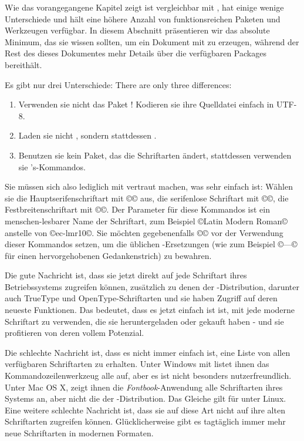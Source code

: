 \documentclass{lltxdoc}
\begin{document}
Wie das vorangegangene Kapitel zeigt ist \lualatex vergleichbar mit \latex, hat 
einige wenige Unterschiede und hält eine höhere Anzahl von funktionsreichen Paketen 
und Werkzeugen verfügbar. In diesem Abschnitt präsentieren wir das absolute
Minimum, das sie wissen sollten, um ein Dokument mit \lualatex zu erzeugen, während 
der Rest des dieses Dokumentes mehr Details über die verfügbaren Packages 
bereithält.

Es gibt nur drei Unterschiede:
There are only three differences:
\begin{enumerate}
  \item Verwenden sie nicht das Paket ! Kodieren sie ihre Quelldatei
        einfach in UTF-8.
  \item Laden sie nicht , sondern stattdessen .

  \item Benutzen sie kein Paket, das die Schriftarten ändert, stattdessen
        verwenden sie 's-Kommandos.
\end{enumerate}

Sie müssen sich also lediglich  mit  vertraut machen, was sehr 
einfach ist: Wählen sie die Hauptserifenschriftart mit ©\setmainfont© aus, die 
serifenlose Schriftart mit ©\setsansfont©, die Festbreitenschriftart mit
©\setmonofont©. Der Parameter für diese Kommandos ist ein menschen-lesbarer
Name der Schriftart, zum Beispiel ©Latin Modern Roman© anstelle von ©ec-lmr10©. 
Sie möchten gegebenenfalls ©© vor der 
Verwendung dieser Kommandos setzen, um die üblichen \tex-Ersetzungen (wie zum
Beispiel ©---© für einen hervorgehobenen Gedankenstrich) zu bewahren.

Die gute Nachricht ist, dass sie jetzt direkt auf jede Schriftart ihres 
Betriebssystems zugreifen können, zusätzlich zu denen der \tex-Distribution, 
darunter auch TrueType und OpenType-Schriftarten und sie haben Zugriff auf
deren neueste Funktionen. Das bedeutet, dass es jetzt einfach ist ist, mit 
\lualatex jede moderne Schriftart zu verwenden, die sie heruntergeladen oder
gekauft haben - und sie profitieren von deren vollem Potenzial.

Die schlechte Nachricht ist, dass es nicht immer einfach ist, eine Liste von
allen verfügbaren Schriftarten zu erhalten. Unter Windows mit \texlive listet
ihnen das Kommandozeilenwerkzeug  alle auf, aber es ist nicht 
besonders nutzerfreundlich. Unter Mac OS X, zeigt ihnen die 
\emph{Fontbook}-Anwendung alle Schriftarten ihres Systems an, aber nicht die
der \tex-Distribution. Das Gleiche gilt für  unter Linux. Eine 
weitere schlechte Nachricht ist, dass sie auf diese Art nicht auf ihre alten
Schriftarten zugreifen können. Glücklicherweise gibt es tagtäglich immer mehr
neue Schriftarten in modernen Formaten.
\end{document}
